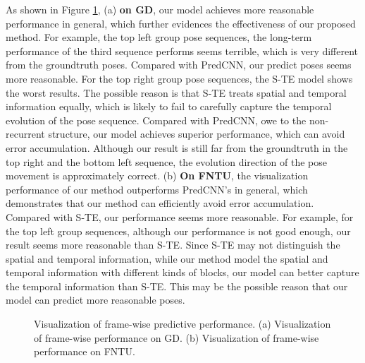\documentclass[journal]{IEEEtran}
\begin{document}
As shown in Figure \ref{fig14}, (a) {\bf on GD}, our model achieves more reasonable performance in general, which further evidences the effectiveness of our proposed method. For example, the top left group pose sequences, the long-term performance of the third sequence performs seems terrible, which is very different from the groundtruth poses. Compared with PredCNN, our predict poses seems more reasonable. For the top right group pose sequences, the S-TE model shows the worst results. The possible reason is that S-TE treats spatial and temporal information equally, which is likely to fail to carefully capture the temporal evolution of the pose sequence. Compared with PredCNN, owe to the non-recurrent structure, our model achieves superior performance, which can avoid error accumulation. Although our result is still far from the groundtruth in the top right and the bottom left sequence, the evolution direction of the pose movement is approximately correct. (b) {\bf On FNTU}, the visualization performance of our method outperforms PredCNN's in general, which demonstrates that our method can efficiently avoid error accumulation. Compared with S-TE, our performance seems more reasonable. For example, for the top left group sequences, although our performance is not good enough, our result seems more reasonable than S-TE. Since S-TE may not distinguish the spatial and temporal information, while our method model the spatial and temporal information with different kinds of blocks, our model can better capture the temporal information than S-TE. This may be the possible reason that our model can predict more reasonable poses.


\begin{figure}[!t]
\centering
{}
\hfil
{}
\caption{ Visualization of frame-wise predictive performance. (a) Visualization of frame-wise performance on GD. (b) Visualization of frame-wise performance on FNTU. }
\label{fig14}
\end{figure}
\end{document}
